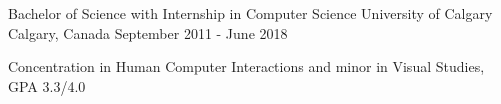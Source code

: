 \begin{cventries}
  \cventry
    {Bachelor of Science with Internship in Computer Science}
    {University of Calgary}
    {Calgary, Canada}
    {September 2011 - June 2018}
    {
      \begin{cvitems}
      \item {Concentration in Human Computer Interactions and minor in Visual Studies, GPA 3.3/4.0}
      \end{cvitems}
    }
\end{cventries}
